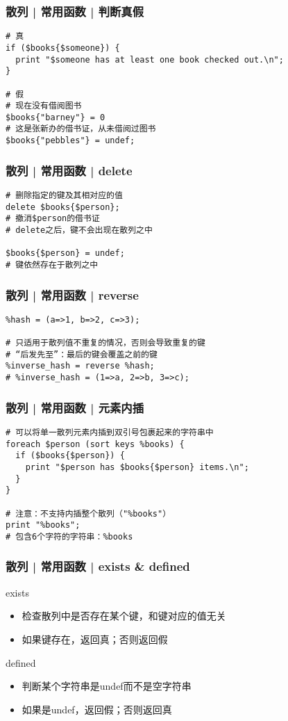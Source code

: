 \begin{frame}[fragile]
  \frametitle{散列 | \alert{常用函数} | 判断真假}
\begin{lstlisting}
# 真
if ($books{$someone}) {
  print "$someone has at least one book checked out.\n";
}

# 假
# 现在没有借阅图书
$books{"barney"} = 0
# 这是张新办的借书证，从未借阅过图书
$books{"pebbles"} = undef;
\end{lstlisting}
\end{frame}

\begin{frame}[fragile]
  \frametitle{散列 | \alert{常用函数} | delete}
\begin{lstlisting}
# 删除指定的键及其相对应的值
delete $books{$person};
# 撤消$person的借书证
# delete之后，键不会出现在散列之中

$books{$person} = undef;
# 键依然存在于散列之中
\end{lstlisting}
\end{frame}

\begin{frame}[fragile]
  \frametitle{散列 | \alert{常用函数} | reverse}
\begin{lstlisting}
%hash = (a=>1, b=>2, c=>3);

# 只适用于散列值不重复的情况，否则会导致重复的键
# “后发先至”：最后的键会覆盖之前的键
%inverse_hash = reverse %hash;
# %inverse_hash = (1=>a, 2=>b, 3=>c);
\end{lstlisting}
\end{frame}

\begin{frame}[fragile]
  \frametitle{散列 | \alert{常用函数} | 元素内插}
\begin{lstlisting}
# 可以将单一散列元素内插到双引号包裹起来的字符串中
foreach $person (sort keys %books) {
  if ($books{$person}) {
    print "$person has $books{$person} items.\n";
  }
}

# 注意：不支持内插整个散列（"%books"）
print "%books";
# 包含6个字符的字符串：%books
\end{lstlisting}
\end{frame}

\begin{frame}[fragile]
  \frametitle{散列 | \alert{常用函数} | exists \& defined}
  \begin{block}{exists}
    \begin{itemize}
      \item 检查散列中是否存在某个键，和键对应的值无关
      \item 如果键存在，返回真；否则返回假
    \end{itemize}
  \end{block}
  \pause
  \begin{block}{defined}
    \begin{itemize}
      \item 判断某个字符串是undef而不是空字符串
      \item 如果是undef，返回假；否则返回真
    \end{itemize}
  \end{block}
\end{frame}

